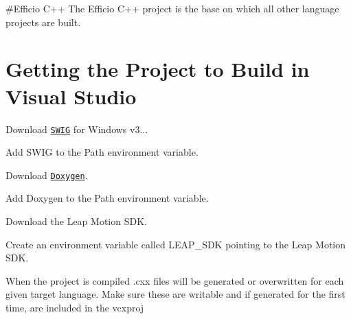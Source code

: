 \#\+Efficio C++ The Efficio C++ project is the base on which all other language projects are built.

\section*{Getting the Project to Build in Visual Studio }


\begin{DoxyEnumerate}
\item Download \href{http://swig.org/download}{\tt S\+W\+IG} for Windows v3...
\end{DoxyEnumerate}
\begin{DoxyEnumerate}
\item Add S\+W\+IG to the Path environment variable.
\end{DoxyEnumerate}
\begin{DoxyEnumerate}
\item Download \href{http://doxygen.org}{\tt Doxygen}.
\end{DoxyEnumerate}
\begin{DoxyEnumerate}
\item Add Doxygen to the Path environment variable.
\end{DoxyEnumerate}
\begin{DoxyEnumerate}
\item Download the Leap Motion S\+DK.
\end{DoxyEnumerate}
\begin{DoxyEnumerate}
\item Create an environment variable called L\+E\+A\+P\+\_\+\+S\+DK pointing to the Leap Motion S\+DK.
\end{DoxyEnumerate}
\begin{DoxyEnumerate}
\item When the project is compiled .cxx files will be generated or overwritten for each given target language. Make sure these are writable and if generated for the first time, are included in the vcxproj 
\end{DoxyEnumerate}